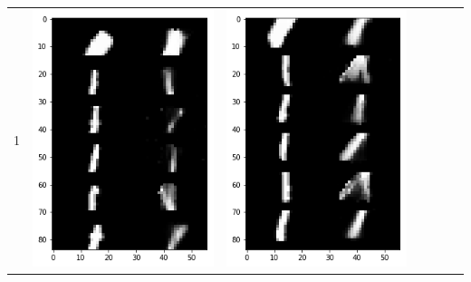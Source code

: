 \documentclass[12pt]{report} %
\begin{document}
\begin{tabular}{m{0.7cm}m{2.4cm}m{2.4cm}m{2.4cm}m{2.4cm}m{2.4cm}m{2.4cm}}
	1 & \includegraphics[scale=0.3]{pictures/KE_1_up.png} & \includegraphics[scale=0.3]{pictures/KE_1_down.png} &

\end{tabular}
\end{document}
